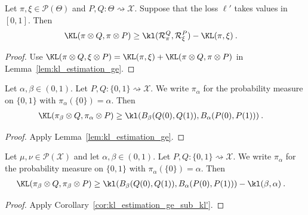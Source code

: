 \begin{corollary}
  \label{cor:kl_estimation_ge_sub_kl'}
  Let $\pi, \xi \in \mathcal P(\Theta)$ and $P, Q : \Theta \rightsquigarrow \mathcal X$. Suppose that the loss $\ell'$ takes values in $[0,1]$. Then
  \begin{align*}
  \KL(\pi \otimes Q, \pi \otimes P)
  &\ge \kl(\mathcal R_\pi^Q, \mathcal R_\xi^P) - \KL(\pi, \xi)
  \: .
  \end{align*}
\end{corollary}

\begin{proof}%
{}
Use $\KL(\pi \otimes Q, \xi \otimes P) = \KL(\pi, \xi) + \KL(\pi \otimes Q, \pi \otimes P)$ in Lemma~\ref{lem:kl_estimation_ge}.
\end{proof}


\begin{corollary}
  \label{cor:kl_estimation_ge_binary}
  Let $\alpha, \beta \in (0, 1)$. Let $P, Q : \{0,1\} \rightsquigarrow \mathcal X$. We write $\pi_\alpha$ for the probability measure on $\{0,1\}$ with $\pi_\alpha(\{0\}) = \alpha$. Then
  \begin{align*}
  \KL(\pi_\beta \otimes Q, \pi_\alpha \otimes P)
  &\ge \kl(B_\beta(Q(0), Q(1)), B_\alpha(P(0), P(1)))
  \: .
  \end{align*}
\end{corollary}

\begin{proof}%
{}
Apply Lemma~\ref{lem:kl_estimation_ge}.
\end{proof}


\begin{corollary}
  \label{cor:kl_estimation_ge_sub_kl}
  Let $\mu, \nu \in \mathcal P(\mathcal X)$ and let $\alpha, \beta \in (0, 1)$. Let $P, Q : \{0,1\} \rightsquigarrow \mathcal X$. We write $\pi_\alpha$ for the probability measure on $\{0,1\}$ with $\pi_\alpha(\{0\}) = \alpha$. Then
  \begin{align*}
  \KL(\pi_\beta \otimes Q, \pi_\beta \otimes P)
  &\ge \kl(B_\beta(Q(0), Q(1)), B_\alpha(P(0), P(1))) - \kl(\beta, \alpha)
  \: .
  \end{align*}
\end{corollary}

\begin{proof}%
Apply Corollary~\ref{cor:kl_estimation_ge_sub_kl'}.
\end{proof}


